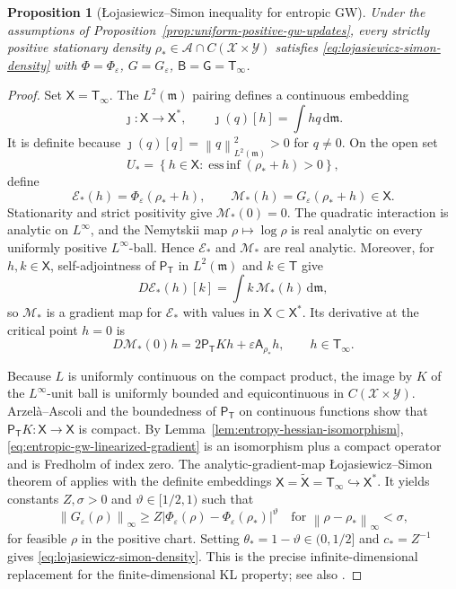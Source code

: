 \documentclass[11pt]{article}
\newtheorem{proposition}[theorem]{Proposition}
\theoremstyle{definition}
\theoremstyle{remark}
\newcommand{\dd}{\,\mathrm d}
\newcommand{\eps}{\varepsilon}
\newcommand{\norm}[1]{\left\lVert #1\right\rVert}
\begin{document}
\begin{proposition}[{\L}ojasiewicz--Simon inequality for entropic GW]
\label{prop:ls-entropic-gw}
Under the assumptions of
Proposition~\ref{prop:uniform-positive-gw-updates}, every strictly positive
stationary density
\(\rho_*\in\mathcal A\cap C(\mathcal X\times\mathcal Y)\) satisfies
\eqref{eq:lojasiewicz-simon-density} with \(\Phi=\Phi_\eps\),
\(G=G_\eps\), \(\mathsf B=\mathsf G=\mathsf T_\infty\).
\end{proposition}

\begin{proof}
Set \(\mathsf X=\mathsf T_\infty\).  The \(L^2(\mathfrak m)\) pairing defines
a continuous embedding
\[
 \jmath:\mathsf X\longrightarrow\mathsf X^*,
 \qquad
 \jmath(q)[h]=\int hq\dd\mathfrak m.
\]
It is definite because
\(\jmath(q)[q]=\norm q_{L^2(\mathfrak m)}^2>0\) for \(q\neq0\).
On the open set
\[
 U_*=
 \left\{
 h\in\mathsf X:
 \operatorname*{ess\,inf}(\rho_*+h)>0
 \right\},
\]
define
\[
 \mathcal E_*(h)=\Phi_\eps(\rho_*+h),
 \qquad
 \mathcal M_*(h)=G_\eps(\rho_*+h)\in\mathsf X.
\]
Stationarity and strict positivity give \(\mathcal M_*(0)=0\).  The
quadratic interaction is analytic on \(L^\infty\), and the Nemytskii map
\(\rho\mapsto\log\rho\) is real analytic on every uniformly positive
\(L^\infty\)-ball.  Hence \(\mathcal E_*\) and \(\mathcal M_*\) are real
analytic.  Moreover, for \(h,k\in\mathsf X\), self-adjointness of
\(\mathsf P_{\mathsf T}\) in \(L^2(\mathfrak m)\) and
\(k\in\mathsf T\) give
\[
 D\mathcal E_*(h)[k]
 =
 \int k\,\mathcal M_*(h)\dd\mathfrak m,
\]
so \(\mathcal M_*\) is a gradient map for \(\mathcal E_*\) with values in
\(\mathsf X\subset\mathsf X^*\).  Its derivative at the critical point
\(h=0\) is
\begin{equation}\label{eq:entropic-gw-linearized-gradient}
 D\mathcal M_*(0)h
 =
 2\mathsf P_{\mathsf T}Kh
 +
 \eps\mathsf A_{\rho_*}h,
 \qquad h\in\mathsf T_\infty.
\end{equation}

Because \(L\) is uniformly continuous on the compact product, the image by
\(K\) of the \(L^\infty\)-unit ball is uniformly bounded and
equicontinuous in \(C(\mathcal X\times\mathcal Y)\).  Arzel\`a--Ascoli and
the boundedness of \(\mathsf P_{\mathsf T}\) on continuous functions show
that \(\mathsf P_{\mathsf T}K:\mathsf X\to\mathsf X\) is compact.  By
Lemma~\ref{lem:entropy-hessian-isomorphism},
\eqref{eq:entropic-gw-linearized-gradient} is an isomorphism plus a compact
operator and is Fredholm of index zero.  The analytic-gradient-map
{\L}ojasiewicz--Simon theorem of \citet{FeehanMaridakis2020} applies with
the definite embeddings
\(\mathsf X=\widetilde{\mathsf X}=\mathsf T_\infty
\hookrightarrow\mathsf X^*\).  It yields constants
\(Z,\sigma>0\) and \(\vartheta\in[1/2,1)\) such that
\[
 \norm{G_\eps(\rho)}_\infty
 \geq
 Z\left|\Phi_\eps(\rho)-\Phi_\eps(\rho_*)\right|^\vartheta
 \quad
 \text{for }\norm{\rho-\rho_*}_\infty<\sigma,
\]
for feasible \(\rho\) in the positive chart.  Setting
\(\theta_*=1-\vartheta\in(0,1/2]\) and \(c_*=Z^{-1}\) gives
\eqref{eq:lojasiewicz-simon-density}.  This is the precise
infinite-dimensional replacement for the finite-dimensional KL property;
see also \citet{Chill2003}.
\end{proof}
\end{document}
